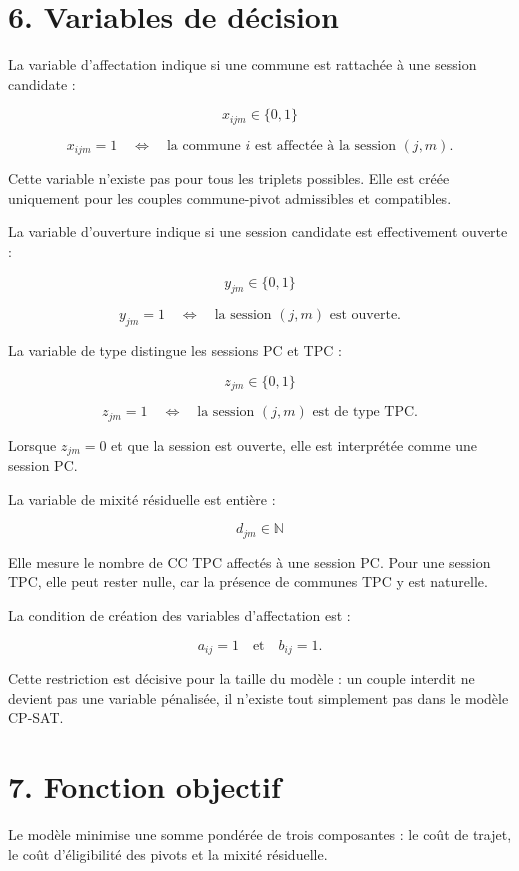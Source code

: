 \documentclass[11pt,a4paper]{article}
\begin{document}
\newpage
\section{6. Variables de décision}

La variable d'affectation indique si une commune est rattachée à une session candidate :

\[
x_{ijm} \in \{0,1\}
\]

\[
x_{ijm}=1
\quad \Longleftrightarrow \quad
\text{la commune } i \text{ est affectée à la session } (j,m).
\]

Cette variable n'existe pas pour tous les triplets possibles. Elle est créée uniquement pour les couples commune-pivot admissibles et compatibles.

La variable d'ouverture indique si une session candidate est effectivement ouverte :

\[
y_{jm} \in \{0,1\}
\]

\[
y_{jm}=1
\quad \Longleftrightarrow \quad
\text{la session } (j,m) \text{ est ouverte.}
\]

La variable de type distingue les sessions PC et TPC :

\[
z_{jm} \in \{0,1\}
\]

\[
z_{jm}=1
\quad \Longleftrightarrow \quad
\text{la session } (j,m) \text{ est de type TPC.}
\]

Lorsque $z_{jm} = 0$ et que la session est ouverte, elle est interprétée comme une session PC.

La variable de mixité résiduelle est entière :

\[
d_{jm} \in \mathbb{N}
\]

Elle mesure le nombre de CC TPC affectés à une session PC. Pour une session TPC, elle peut rester nulle, car la présence de communes TPC y est naturelle.

La condition de création des variables d'affectation est :

\[
a_{ij}=1
\quad \text{et} \quad
b_{ij}=1.
\]

Cette restriction est décisive pour la taille du modèle : un couple interdit ne devient pas une variable pénalisée, il n'existe tout simplement pas dans le modèle CP-SAT.

\newpage
\section{7. Fonction objectif}

Le modèle minimise une somme pondérée de trois composantes : le coût de trajet, le coût d'éligibilité des pivots et la mixité résiduelle.
\end{document}
